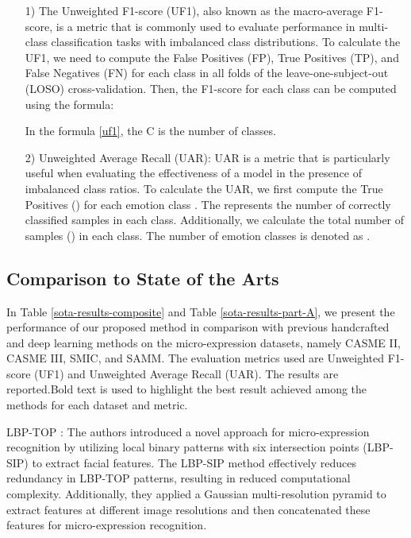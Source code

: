 \documentclass[review,12pt, 3p]{elsarticle}
\begin{document}
\begin{itemize}
  \item [1) ] The Unweighted F1-score (UF1), also known as the macro-average F1-score, is a metric that is commonly used to evaluate performance in multi-class classification tasks with imbalanced class distributions. To calculate the UF1, we need to compute the False Positives (FP), True Positives (TP), and False Negatives (FN) for each class  in all folds of the leave-one-subject-out (LOSO) cross-validation. Then, the F1-score for each class  can be computed using the formula:

In the formula \ref{uf1}, the C is the number of classes.
  
  \item [2) ] Unweighted Average Recall (UAR): UAR is a metric that is particularly useful when evaluating the effectiveness of a model in the presence of imbalanced class ratios. To calculate the UAR, we first compute the True Positives () for each emotion class . The  represents the number of correctly classified samples in each class. Additionally, we calculate the total number of samples () in each class. The number of emotion classes is denoted as .
 
\end{itemize}

\subsection {Comparison to State of the Arts}
In Table \ref{sota-results-composite} and Table \ref{sota-results-part-A}, we present the performance of our proposed method in comparison with previous handcrafted and deep learning methods on the micro-expression datasets, namely CASME II, CASME III, SMIC, and SAMM. The evaluation metrics used are Unweighted F1-score (UF1) and Unweighted Average Recall (UAR). The results are reported.Bold text is used to highlight the best result achieved among the methods for each dataset and metric.

LBP-TOP \cite{ref-23}:  The authors introduced a novel approach for micro-expression recognition by utilizing local binary patterns with six intersection points (LBP-SIP) to extract facial features. The LBP-SIP method effectively reduces redundancy in LBP-TOP patterns, resulting in reduced computational complexity. Additionally, they applied a Gaussian multi-resolution pyramid to extract features at different image resolutions and then concatenated these features for micro-expression recognition. 
\end{document}

